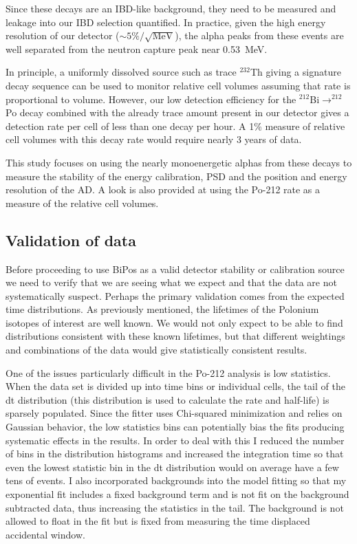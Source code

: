 \begin{itemize}
\end{itemize}

Since these decays are an IBD-like background, they need to be measured and leakage into our IBD selection quantified. In practice, given the high energy resolution of our detector ($\sim5\%/\sqrt{\textrm{MeV}}$), the alpha peaks from these events are well separated from the neutron capture peak near 0.53~MeV.

In principle, a uniformly dissolved source such as trace $^{232}$Th giving a signature decay sequence can be used to monitor relative cell volumes assuming that rate is proportional to volume. However, our low detection efficiency for the $^{212}$Bi$\rightarrow^{212}$Po decay combined with the already trace amount present in our detector gives a detection rate per cell of less than one decay per hour. A 1\% measure of relative cell volumes with this decay rate would require nearly 3 years of data.

This study focuses on using the nearly monoenergetic alphas from these decays to measure the stability of the energy calibration, PSD and the position and energy resolution of the AD. A look is also provided at using the Po-212 rate as a measure of the relative cell volumes. 
\subsection{Validation of data}
Before proceeding to use BiPos as a valid detector stability or calibration source we need to verify that we are seeing what we expect and that the data are not systematically suspect. Perhaps the primary validation comes from the expected time distributions. As previously mentioned, the lifetimes of the Polonium isotopes of interest are well known. We would not only expect to be able to find distributions consistent with these known lifetimes, but that different weightings and combinations of the data would give statistically consistent results. 

One of the issues particularly difficult in the Po-212 analysis is low statistics. When the data set is divided up into time bins or individual cells, the tail of the dt distribution (this distribution is used to calculate the rate and half-life) is sparsely populated. Since the fitter uses Chi-squared minimization and relies on Gaussian behavior, the low statistics bins can potentially bias the fits producing systematic effects in the results. In order to deal with this I reduced the number of bins in the distribution histograms and increased the integration time so that even the lowest statistic bin in the dt distribution would on average have a few tens of events. I also incorporated backgrounds into the model fitting so that my exponential fit includes a fixed background term and is not fit on the background subtracted data, thus increasing the statistics in the tail. The background is not allowed to float in the fit but is fixed from measuring the time displaced accidental window. 

